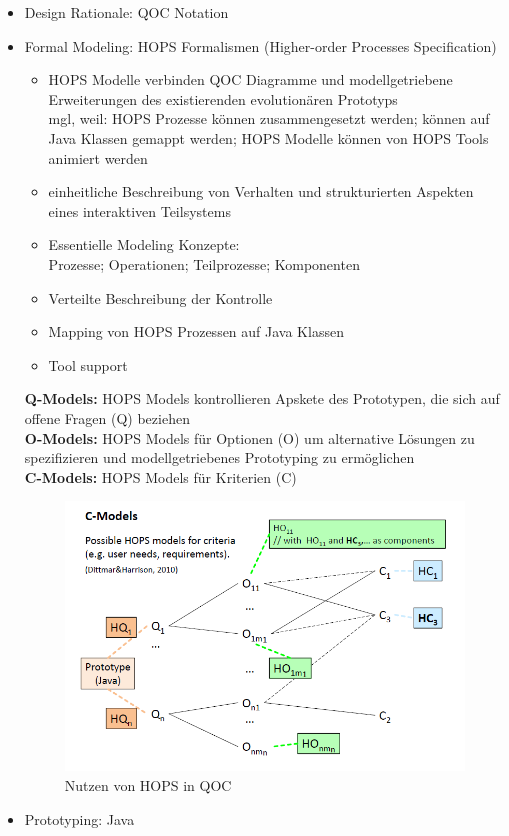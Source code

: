 \begin{itemize}
	\item Design Rationale: QOC Notation
	
	\item Formal Modeling: HOPS Formalismen (Higher-order Processes Specification)
	\begin{itemize}
		\item HOPS Modelle verbinden QOC Diagramme und modellgetriebene Erweiterungen des existierenden evolutionären Prototyps\\
		mgl, weil: HOPS Prozesse können zusammengesetzt werden; können auf Java Klassen gemappt werden; HOPS Modelle können von HOPS Tools animiert werden
		
		\item einheitliche Beschreibung von Verhalten und strukturierten Aspekten eines interaktiven Teilsystems
			
		\item Essentielle Modeling Konzepte:\\
		Prozesse; Operationen; Teilprozesse; Komponenten
		
		\item Verteilte Beschreibung der Kontrolle
		
		\item Mapping von HOPS Prozessen auf Java Klassen
		
		\item Tool support
	\end{itemize}
	\textbf{Q-Models:} HOPS Models kontrollieren Apskete des Prototypen, die sich auf offene Fragen (Q) beziehen\\
	\textbf{O-Models:} HOPS Models für Optionen (O) um alternative Lösungen zu spezifizieren und modellgetriebenes Prototyping zu ermöglichen\\
	\textbf{C-Models:} HOPS Models für Kriterien (C)
	\begin{figure}[!h]
		\centering
		\includegraphics[scale=0.7]{img/hops_models_qoc.png}
		\caption{Nutzen von HOPS in QOC}
	\end{figure}
	\newpage
	\item Prototyping: Java
	

\end{itemize}
